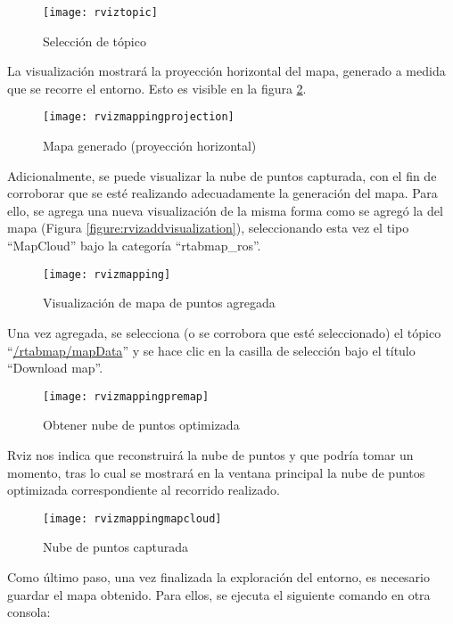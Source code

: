 \begin{figure}[H]
\centering
\texttt{[image: rviztopic]}
\caption{Selección de tópico}
\label{figure:rviztopic}
\end{figure}

La visualización mostrará la proyección horizontal del mapa, generado a medida que se recorre el entorno. Esto es visible en la figura \ref{figure:rvizmappingprojection}.

\begin{figure}[H]
\centering
\texttt{[image: rvizmappingprojection]}
\caption{Mapa generado (proyección horizontal)}
\label{figure:rvizmappingprojection}
\end{figure}

Adicionalmente, se puede visualizar la nube de puntos capturada, con el fin de corroborar que se esté realizando adecuadamente la generación del mapa. Para ello, se agrega una nueva visualización de la misma forma como se agregó la del mapa (Figura \ref{figure:rvizaddvisualization}), seleccionando esta vez el tipo ``MapCloud'' bajo la categoría ``rtabmap\_ros''.

\begin{figure}[H]
\centering
\texttt{[image: rvizmapping]}
\caption{Visualización de mapa de puntos agregada}
\label{figure:rvizmapping}
\end{figure}

Una vez agregada, se selecciona (o se corrobora que esté seleccionado) el tópico ``\url{/rtabmap/mapData}'' y se hace clic en la casilla de selección bajo el título ``Download map''.

\begin{figure}[H]
\centering
\texttt{[image: rvizmappingpremap]}
\caption{Obtener nube de puntos optimizada}
\label{figure:rvizmappingpremap}
\end{figure}

Rviz nos indica que reconstruirá la nube de puntos y que podría tomar un momento, tras lo cual se mostrará en la ventana principal la nube de puntos optimizada correspondiente al recorrido realizado.

\begin{figure}[H]
\centering
\texttt{[image: rvizmappingmapcloud]}
\caption{Nube de puntos capturada}
\label{figure:rvizmappingmapcloud}
\end{figure}

Como último paso, una vez finalizada la exploración del entorno, es necesario guardar el mapa obtenido. Para ellos, se ejecuta el siguiente comando en otra consola:

